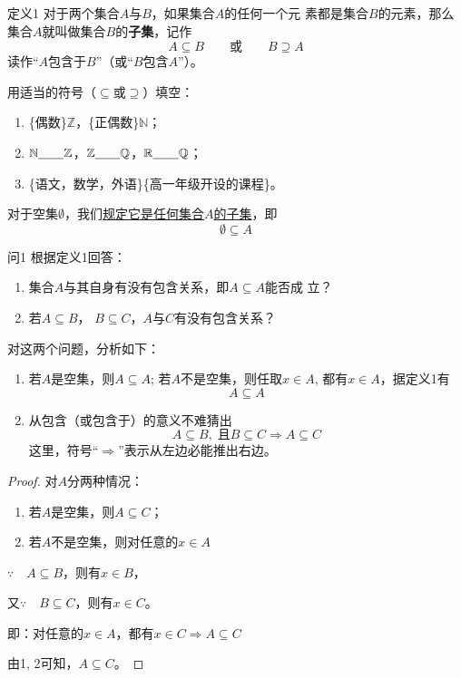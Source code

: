\begin{thm}{定义1}
    对于两个集合$A$与$B$，如果集合$A$的任何一个元
素都是集合$B$的元素，那么集合$A$就叫做集合$B$的\textbf{子集}，记作
\[ A\subseteq B\qquad \text{或}\qquad B\supseteq A\]
读作“$A$包含于$B$”（或“$B$包含$A$”）。
\end{thm}

\begin{ex}
    用适当的符号（$\subseteq$或$\supseteq$）填空：
\begin{enumerate}
    \item \{偶数\}\blank$\mathbb{Z}$，\qquad \{正偶数\}\blank $\mathbb{N}$；
    \item $\mathbb{N}\underline{\qquad} \mathbb{Z}$，\qquad $\mathbb{Z}\underline{\qquad} \mathbb{Q}$，\qquad $\mathbb{R}\underline{\qquad} \mathbb{Q}$；
    \item \{语文，数学，外语\}\blank \{高一年级开设的课程\}。
\end{enumerate}
\end{ex}

对于空集$\emptyset$，我们\underline{规定它是任何集合$A$的子集}，即
\[\emptyset\subseteq A\]

\begin{thm}{问1 }
    根据定义1回答：
\begin{enumerate}[(1)]
\item 集合$A$与其自身有没有包含关系，即$A\subseteq A$能否成
    立？
    \item 若$A\subseteq B$，
    $B\subseteq C$，$A$与$C$有没有包含关系？
\end{enumerate}
\end{thm}

对这两个问题，分析如下：
\begin{enumerate}[(1)]
\item 若$A$是空集，则$A\subseteq A$; 若$A$不是空集，则任取$x\in A$, 都有$x\in A$，据定义1有
\[A\subseteq A\]
\item 从包含（或包含于）的意义不难猜出
\[A\subseteq B,\; \text{且} B\subseteq C\Longrightarrow A\subseteq C\]
这里，符号“$\Longrightarrow$”表示从左边必能推出右边。
\end{enumerate}

\begin{proof}
    对$A$分两种情况：
\begin{enumerate}
\item 若$A$是空集，则$A\subseteq C$；
    \item 若$A$不是空集，则对任意的$x\in A$ 
\end{enumerate}


$\because  \quad  A\subseteq B$，则有$x\in B$，

又$\because\quad B\subseteq C$，则有$x\in C$。

即：对任意的$x\in A$，都有$x\in C\Longrightarrow A\subseteq C$

由1, 2可知，$A\subseteq C$。
\end{proof}

